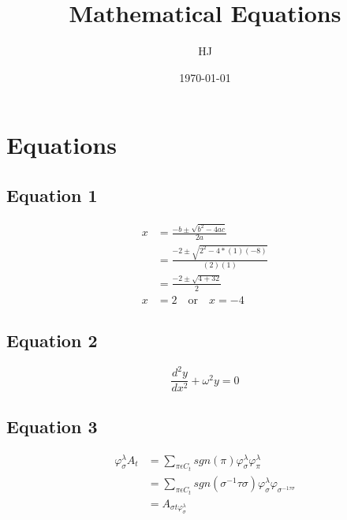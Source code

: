 \documentclass{article}
\begin{document}
	\title{Mathematical Equations}
	\author{HJ}
	\date{\today}
	\maketitle
	\section*{Equations}
	\subsection*{Equation 1}
	\begin{align*}
		x &=\frac{-b\pm \sqrt{{b^2-4ac}}}{2a} \\
		  &=\frac{-2\pm \sqrt{2^2-4*(1)(-8)}}{(2)(1)} \\
		  &=\frac{-2\pm \sqrt{4+32}}{2} \\
		x &=2 \quad \text{or} \quad x = -4
	\end{align*}
	\subsection*{Equation 2}
	\begin{equation}
		\frac{d^2y}{dx^2}+\omega^2y=0
	\end{equation}
	\subsection*{Equation 3}
	\begin{align*}
		\varphi_\sigma^\lambda A_t
		& =\sum_{\pi\epsilon C_t}sgn(\pi)\varphi_\sigma^\lambda 	\varphi_\pi^\lambda \\
		& =\sum_{\pi\epsilon C_t} sgn(\sigma^{-1}\tau\sigma) \varphi_\sigma^\lambda \varphi_{\sigma^{-1\tau\sigma}} \\
		& =A_{\sigma t \varphi_\sigma^\lambda}
	\end{align*}
\end{document}
